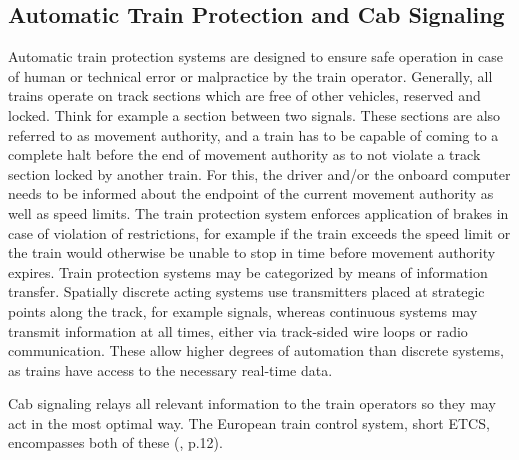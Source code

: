 \subsection{Automatic Train Protection and Cab Signaling}
\label{sec:ATPCS}
\par\noindent
Automatic train protection systems are designed to ensure safe operation in case of human or technical error or malpractice by the train operator. Generally, all trains operate on track sections which are free of other vehicles, reserved and locked. Think for example a section between two signals. These sections are also referred to as movement authority, and a train has to be capable of coming to a complete halt before the end of movement authority as to not violate a track section locked by another train. For this, the driver and/or the onboard computer needs to be informed about the endpoint of the current movement authority as well as speed limits. The train protection system enforces application of brakes in case of violation of restrictions, for example if the train exceeds the speed limit or the train would otherwise be unable to stop in time before movement authority expires. Train protection systems may be categorized by means of information transfer. Spatially discrete acting systems use transmitters placed at strategic points along the track, for example signals, whereas continuous systems may transmit information at all times, either via track-sided wire loops or radio communication. These allow higher degrees of automation than discrete systems, as trains have access to the necessary real-time data.
\par
Cab signaling relays all relevant information to the train operators so they may act in the most optimal way. The European train control system, short ETCS, encompasses both of these (\cite{Havryliuk2017}, p.12).

